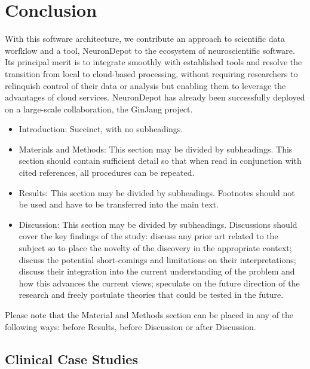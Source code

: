 \documentclass{frontiersSCNS} %
\begin{document}
\section{Conclusion}
With this software architecture, we contribute an approach to scientific data
worfklow and a tool, NeuronDepot to the ecosystem of neuroscientific software.
Its principal merit is to integrate smoothly with established tools and resolve
the transition from local to cloud-based processing, without requiring
researchers to relinquish control of their data or analysis but enabling them
to leverage the advantages of cloud services. NeuronDepot has already been
successfully deployed on a large-scale collaboration, the GinJang project.





\begin{itemize}
\item Introduction: Succinct, with no subheadings.
\item Materials and Methods: This section may be divided by subheadings. This section should contain sufficient detail so that when read in conjunction with cited references, all procedures can be repeated.
\item Results: This section may be divided by subheadings. Footnotes should not be used and have to be transferred into the main text.
\item Discussion: This section may be divided by subheadings. Discussions should cover the key findings of the study: discuss any prior art related to the subject so to place the novelty of the discovery in the appropriate context; discuss the potential short-comings and limitations on their interpretations; discuss their integration into the current understanding of the problem and how this advances the current views; speculate on the future direction of the research and freely postulate theories that could be tested in the future.
\end{itemize}

Please note that the Material and Methods section can be placed in any of the following ways: before Results, before Discussion or after Discussion.

\subsection{Clinical Case Studies}
\end{document}
